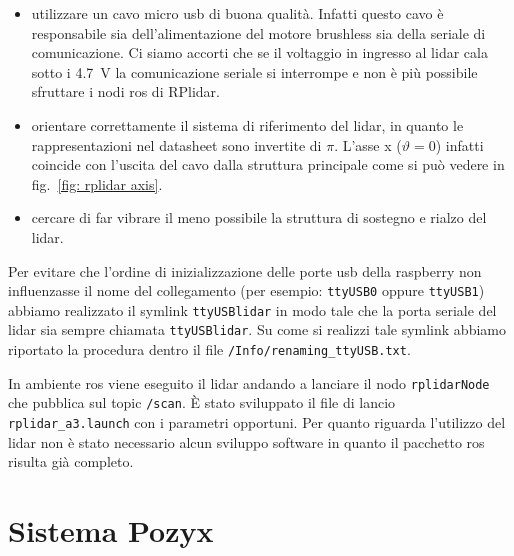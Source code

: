 \begin{itemize}
	\item utilizzare un cavo micro usb di buona qualit\`a. Infatti questo cavo \`e responsabile sia dell'alimentazione del motore brushless sia della seriale di comunicazione.
			Ci siamo accorti che se il voltaggio in ingresso al lidar cala sotto i \SI{4.7}{\volt} la comunicazione seriale si interrompe e non \`e pi\`u possibile sfruttare i nodi ros
			di RPlidar.

	\item orientare correttamente il sistema di riferimento del lidar, in quanto le rappresentazioni nel datasheet sono invertite di $\pi$. 
	L'asse x ($\vartheta = 0$) infatti coincide con l'uscita del cavo dalla struttura principale come si pu\`o vedere in fig.~\ref{fig: rplidar axis}.

	\item cercare di far vibrare il meno possibile la struttura di sostegno e rialzo del lidar.

\end{itemize}

Per evitare che l'ordine di inizializzazione delle porte usb della raspberry non influenzasse il nome del collegamento (per esempio: \texttt{ttyUSB0} oppure \texttt{ttyUSB1})
abbiamo realizzato il symlink \texttt{ttyUSBlidar} in modo tale che la porta seriale del lidar sia sempre chiamata \texttt{ttyUSBlidar}. 
Su come si realizzi tale symlink abbiamo riportato la procedura dentro il file \texttt{/Info/renaming\_ttyUSB.txt}.

In ambiente ros viene eseguito il lidar andando a lanciare il nodo \texttt{rplidarNode} che pubblica sul topic \texttt{/scan}. 
\`E stato sviluppato il file di lancio \texttt{rplidar\_a3.launch} con i parametri opportuni.  
Per quanto riguarda l'utilizzo del lidar non \`e stato necessario alcun sviluppo software in quanto il pacchetto ros risulta gi\`a completo.


\newpage
\section{Sistema Pozyx}
\label{sez:Sistema Pozyx}

